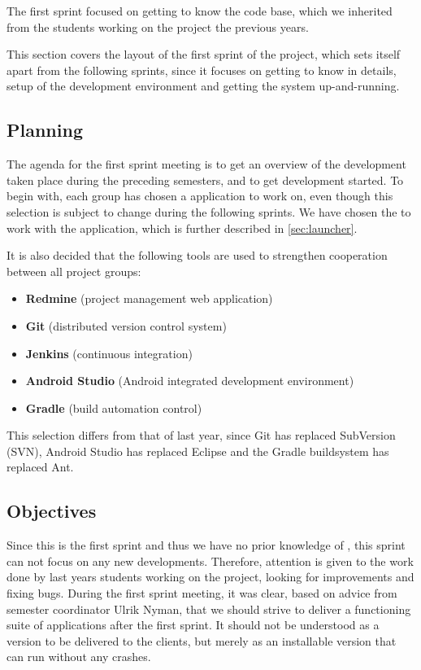 The first sprint focused on getting to know the \giraf code base, which we inherited from the students working on the project the previous years. 

This section covers the layout of the first sprint of the project, which sets itself apart from the following sprints, since it focuses on getting to know \giraf in details, setup of the development environment and getting the system up-and-running.

\subsection{Planning}\label{sec:sprint1:planning}
The agenda for the first sprint meeting is to get an overview of the development taken place during the preceding semesters, and to get development started.
To begin with, each group has chosen a \giraf application to work on, even though this selection is subject to change during the following sprints.
We have chosen the to work with the \launcher application, which is further described in \cref{sec:launcher}.

It is also decided that the following tools are used to strengthen cooperation between all project groups:

\begin{itemize}
\item \textbf{Redmine} (project management web application)
\item \textbf{Git} (distributed version control system)
\item \textbf{Jenkins} (continuous integration)
\item \textbf{Android Studio} (Android integrated development environment)
\item \textbf{Gradle} (build automation control)
\end{itemize}

This selection differs from that of last year, since Git has replaced SubVersion (SVN), Android Studio has replaced Eclipse and the Gradle buildsystem has replaced Ant.

\subsection{Objectives}\label{sec:sprint1:objectives}
Since this is the first sprint and thus we have no prior knowledge of \giraf, this sprint can not focus on any new developments.
Therefore, attention is given to the work done by last years students working on the project, looking for improvements and fixing bugs.
During the first sprint meeting, it was clear, based on advice from semester coordinator Ulrik Nyman, that we should strive to deliver a functioning suite of applications after the first sprint.
It should not be understood as a version to be delivered to the clients, but merely as an installable version that can run without any crashes. 

